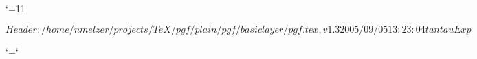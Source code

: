 %

\edef\pgfatcode{\the\catcode`\@}
\catcode`\@=11



\ProvidesPackageRCS $Header: /home/nmelzer/projects/TeX/pgf/plain/pgf/basiclayer/pgf.tex,v 1.3 2005/09/05 13:23:04 tantau Exp $








\catcode`\@=\pgfatcode

\endinput
